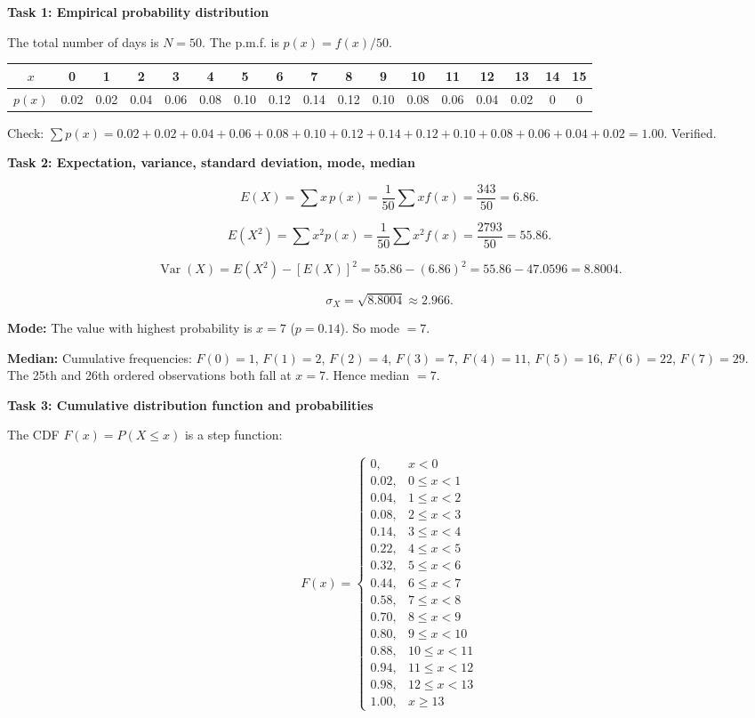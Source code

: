 \documentclass[11pt]{article}
\newcounter{popsec}
\newcounter{popsub}
\newcommand{\courssub}[1]{%
  \stepcounter{popsub}%
  \par\vspace{9pt}\noindent{\popxbold\fontsize{11.5}{13}\selectfont\color{popink}{\color{poporange}\thepopsec.\thepopsub}\hspace{6pt}#1}\par\nopagebreak\vspace{4pt}
}
\begin{document}
\courssub{Model answer}
\begin{exoresolu}
\textbf{Task 1: Empirical probability distribution}

The total number of days is \(N=50\). The p.m.f. is \(p(x)=f(x)/50\).

\begin{center}
\begin{tabular}{|c|cccccccccccccccc|}
\hline
\rowcolor{popblueL}
\(x\) & 0 & 1 & 2 & 3 & 4 & 5 & 6 & 7 & 8 & 9 & 10 & 11 & 12 & 13 & 14 & 15 \\ \hline
\(p(x)\) & 0.02 & 0.02 & 0.04 & 0.06 & 0.08 & 0.10 & 0.12 & 0.14 & 0.12 & 0.10 & 0.08 & 0.06 & 0.04 & 0.02 & 0 & 0 \\ \hline
\end{tabular}
\end{center}

Check: \(\sum p(x)=0.02+0.02+0.04+0.06+0.08+0.10+0.12+0.14+0.12+0.10+0.08+0.06+0.04+0.02=1.00\). Verified.

\textbf{Task 2: Expectation, variance, standard deviation, mode, median}

\[
E(X)=\sum x\,p(x)=\frac{1}{50}\sum x f(x)=\frac{343}{50}=6.86.
\]

\[
E(X^2)=\sum x^2 p(x)=\frac{1}{50}\sum x^2 f(x)=\frac{2793}{50}=55.86.
\]

\[
\operatorname{Var}(X)=E(X^2)-[E(X)]^2=55.86-(6.86)^2=55.86-47.0596=8.8004.
\]

\[
\sigma_X=\sqrt{8.8004}\approx 2.966.
\]

\textbf{Mode:} The value with highest probability is \(x=7\) (\(p=0.14\)). So mode \(=7\).

\textbf{Median:} Cumulative frequencies: 
\(F(0)=1\), \(F(1)=2\), \(F(2)=4\), \(F(3)=7\), \(F(4)=11\), \(F(5)=16\), \(F(6)=22\), \(F(7)=29\). 
The 25th and 26th ordered observations both fall at \(x=7\). Hence median \(=7\).

\textbf{Task 3: Cumulative distribution function and probabilities}

The CDF \(F(x)=P(X\le x)\) is a step function:

\[
F(x)=
\begin{cases}
0, & x<0\\
0.02, & 0\le x<1\\
0.04, & 1\le x<2\\
0.08, & 2\le x<3\\
0.14, & 3\le x<4\\
0.22, & 4\le x<5\\
0.32, & 5\le x<6\\
0.44, & 6\le x<7\\
0.58, & 7\le x<8\\
0.70, & 8\le x<9\\
0.80, & 9\le x<10\\
0.88, & 10\le x<11\\
0.94, & 11\le x<12\\
0.98, & 12\le x<13\\
1.00, & x\ge 13
\end{cases}
\]


\end{exoresolu}
\end{document}

